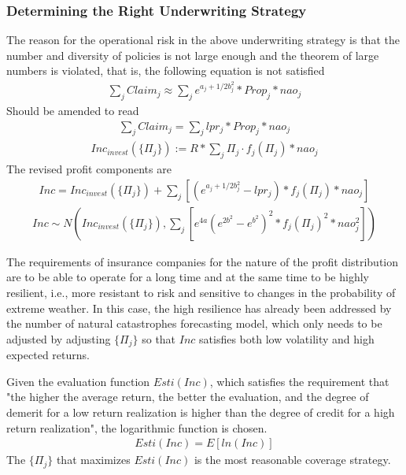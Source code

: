\documentclass[12pt]{article}  %
\begin{document}
\subsubsection{Determining the Right Underwriting Strategy}
The reason for the operational risk in the above underwriting strategy is that the number and diversity of policies is not large enough and the theorem of large numbers is violated, that is, the following equation is not satisfied
\begin{align*}
    \sum\limits_jClaim_j\approx \sum\limits_j e^{a_j+1/2b_j^2}*Prop_j*nao_j
\end{align*}
Should be amended to read
\begin{align*}
    \sum\limits_jClaim_j= \sum\limits_j lpr_j*Prop_j*nao_j
\end{align*}
\begin{align*}
    Inc_{invest}(\{\Pi_j\}):=R*\sum\limits_j \Pi_j\cdot f_j(\Pi_j)*nao_j
\end{align*}
The revised profit components are
\begin{align*}
    Inc=Inc_{invest}(\{\Pi_j\})+\sum\limits_j [(e^{a_j+1/2b_j^2}-lpr_j)*f_j(\Pi_j)*nao_j]
\end{align*}
\begin{align*}
    Inc  \sim N(Inc_{invest}(\{\Pi_j\}),\sum\limits_j [e^{4a}(e^{2b^2}-e^{b^2})^2*f_j(\Pi_j)^2*nao_j^2])
\end{align*}

The requirements of insurance companies for the nature of the profit distribution are to be able to operate for a long time and at the same time to be highly resilient, i.e., more resistant to risk and sensitive to changes in the probability of extreme weather. In this case, the high resilience has already been addressed by the number of natural catastrophes forecasting model, which only needs to be adjusted by adjusting $\{\Pi_j\}$ so that $Inc$ satisfies both low volatility and high expected returns.

Given the evaluation function $Esti(Inc)$, which satisfies the requirement that "the higher the average return, the better the evaluation, and the degree of demerit for a low return realization is higher than the degree of credit for a high return realization", the logarithmic function is chosen.
\begin{align*}
    Esti(Inc)=E[ln(Inc)]
\end{align*}
The $\{\Pi_j\}$ that maximizes $Esti(Inc)$ is the most reasonable coverage strategy.
\end{document}
